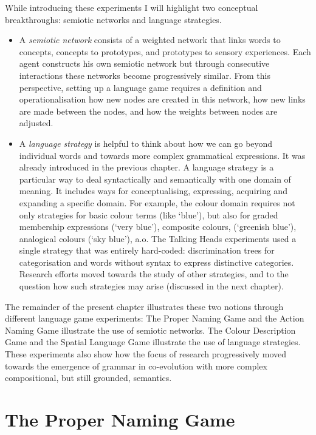 While introducing these experiments I will highlight two conceptual breakthroughs: semiotic networks and language strategies. 
\begin{itemize}
\item A {\itshape semiotic network} consists of a weighted network that links words to concepts, concepts to prototypes, and prototypes to 
sensory experiences. Each agent constructs his own semiotic network but through consecutive 
interactions these networks become progressively similar. From this perspective, setting up a language game requires a definition and 
operationalisation how new nodes are created in this network, how new links are made between 
the nodes, and how the weights between nodes are adjusted. 
\item A {\itshape language strategy} is helpful to think about how we can go beyond individual words and towards 
more complex grammatical expressions. It was already introduced in the previous chapter. 
A language strategy is a particular way to deal syntactically and semantically 
with one domain of meaning. It includes ways for conceptualising, expressing, acquiring and expanding a specific domain. 
For example, the colour domain requires not only strategies for basic colour terms (like `blue'), but also for 
graded membership expressions (`very blue'), composite colours, (`greenish blue'), analogical colours (`sky blue'), a.o. 
The Talking Heads experiments used a single strategy that was entirely hard-coded: discrimination trees for categorisation 
and words without syntax to express distinctive categories. Research efforts moved towards the study of other strategies, and 
to the question how such strategies may arise (discussed in the next chapter). 
\end{itemize}
The remainder of the present chapter illustrates these two notions through different language game experiments: The Proper 
Naming Game and the Action Naming Game illustrate the use of semiotic networks. The Colour Description Game and the 
Spatial Language Game illustrate the use of language strategies. These experiments also show how the focus of research 
progressively moved towards the emergence of grammar in co-evolution with more complex compositional, but still 
grounded, semantics. 

\section{The Proper Naming Game}

